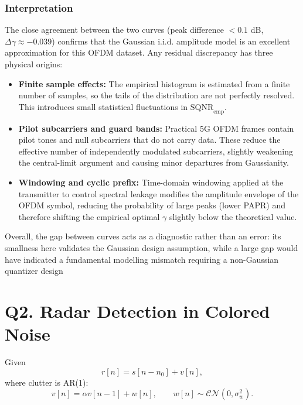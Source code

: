 \documentclass{article}
\begin{document}
\subsubsection*{Interpretation}

The close agreement between the two curves (peak difference $< 0.1$ dB, 
$\Delta\gamma \approx -0.039$) confirms that the Gaussian i.i.d. amplitude 
model is an excellent approximation for this OFDM dataset. Any residual 
discrepancy has three physical origins:

\begin{itemize}
    \item \textbf{Finite sample effects:} The empirical histogram is 
          estimated from a finite number of samples, so the tails of the 
          distribution are not perfectly resolved. This introduces small 
          statistical fluctuations in $\text{SQNR}_{\text{emp}}$.

    \item \textbf{Pilot subcarriers and guard bands:} Practical 5G OFDM 
          frames contain pilot tones and null subcarriers that do not carry 
          data. These reduce the effective number of independently modulated 
          subcarriers, slightly weakening the central-limit argument and 
          causing minor departures from Gaussianity.

    \item \textbf{Windowing and cyclic prefix:} Time-domain windowing 
          applied at the transmitter to control spectral leakage modifies the 
          amplitude envelope of the OFDM symbol, reducing the probability of 
          large peaks (lower PAPR) and therefore shifting the empirical 
          optimal $\gamma$ slightly below the theoretical value.
\end{itemize}

Overall, the gap between curves acts as a diagnostic rather than an error: 
its smallness here validates the Gaussian design assumption, while a large 
gap would have indicated a fundamental modelling mismatch requiring a 
non-Gaussian quantizer design


\section{Q2. Radar Detection in Colored Noise}

Given
\begin{equation*}
r[n] = s[n-n_0] + v[n],
\end{equation*}
where clutter is AR(1):
\begin{equation*}
v[n] = \alpha v[n-1] + w[n], \qquad w[n]\sim\mathcal{CN}(0,\sigma_w^2).
\end{equation*}
\end{document}
